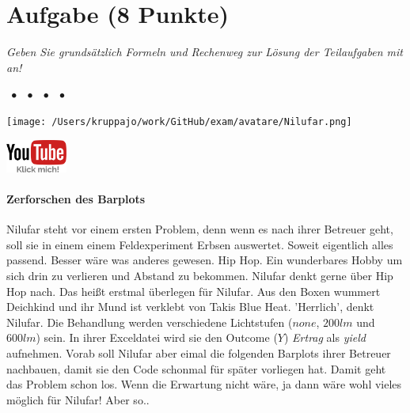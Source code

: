 \documentclass[a4paper, 9pt]{scrartcl}\usepackage[]{graphicx}\usepackage[]{xcolor}
\begin{document}
\section{Aufgabe \hfill (8 Punkte)}

\textit{Geben Sie grundsätzlich Formeln und Rechenweg zur Lösung der Teilaufgaben mit an!} \\[1Ex]
 

 
\ifcollection
\begin{flushright}
\tiny\vspace{-3Ex}
\textbf{\examinhaltstart}
\exammodulemathstat $\;\bullet$
\exammodulestat $\;\bullet$
\exammodulestatbbv $\;\bullet$
\exammodulestatversuch $\;\bullet$
\exammodulebiostat
\vspace{-4Ex}
\end{flushright}
\begin{minipage}[t]{0.5\textwidth}
\texttt{[image: /Users/kruppajo/work/GitHub/exam/avatare/Nilufar.png]}
\end{minipage}
\begin{minipage}[t]{0.5\textwidth}
\hfill
\href{https://youtu.be/t0WYa_LVc5o}{\includegraphics[width = 2cm]{img/youtube}}
\end{minipage}
\vspace{-3ex}
\fi



\ifcollection
\paragraph{Zerforschen des Barplots}
\fi

Nilufar steht vor einem ersten Problem, denn wenn es nach ihrer Betreuer geht, soll sie in einem einem Feldexperiment Erbsen auswertet. Soweit eigentlich alles passend. Besser wäre was anderes gewesen. Hip Hop. Ein wunderbares Hobby um sich drin zu verlieren und Abstand zu bekommen. Nilufar denkt gerne über Hip Hop nach. Das heißt erstmal überlegen für Nilufar. Aus den Boxen wummert Deichkind und ihr Mund ist verklebt von Takis Blue Heat. 'Herrlich', denkt Nilufar. Die Behandlung werden verschiedene Lichtstufen ($none$, $200lm$ und $600lm$) sein. In ihrer Exceldatei wird sie den Outcome ($Y$) \textit{Ertrag} als \textit{yield} aufnehmen. Vorab soll Nilufar aber eimal die folgenden Barplots ihrer Betreuer nachbauen, damit sie den \Rlogo Code schonmal für später vorliegen hat. Damit geht das Problem schon los. Wenn die Erwartung nicht wäre, ja dann wäre wohl vieles möglich für Nilufar! Aber so..
\end{document}
